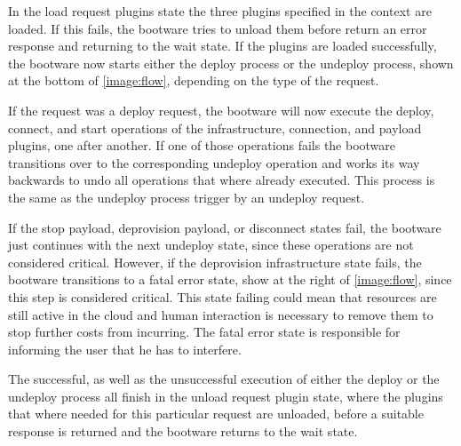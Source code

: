 In the load request plugins state the three plugins specified in the context are loaded.
If this fails, the bootware tries to unload them before return an error response and returning to the wait state.
If the plugins are loaded successfully, the bootware now starts either the deploy process or the undeploy process, shown at the bottom of \autoref{image:flow}, depending on the type of the request.

If the request was a deploy request, the bootware will now execute the deploy, connect, and start operations of the infrastructure, connection, and payload plugins, one after another.
If one of those operations fails the bootware transitions over to the corresponding undeploy operation and works its way backwards to undo all operations that where already executed.
This process is the same as the undeploy process trigger by an undeploy request.

If the stop payload, deprovision payload, or disconnect states fail, the bootware just continues with the next undeploy state, since these operations are not considered critical.
However, if the deprovision infrastructure state fails, the bootware transitions to a fatal error state, show at the right of \autoref{image:flow}, since this step is considered critical.
This state failing could mean that resources are still active in the cloud and human interaction is necessary to remove them to stop further costs from incurring.
The fatal error state is responsible for informing the user that he has to interfere.

The successful, as well as the unsuccessful execution of either the deploy or the undeploy process all finish in the unload request plugin state, where the plugins that where needed for this particular request are unloaded, before a suitable response is returned and the bootware returns to the wait state.

